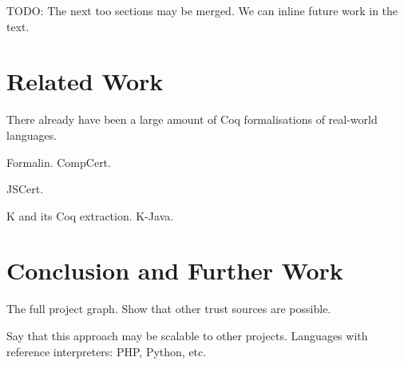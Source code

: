 \documentclass[9pt, sigplan, natbib=false, screen=true]{acmart}
\newcommand\Coq{Coq}
\begin{document}
TODO: The next too sections may be merged. We can inline future work in the text.
\section{Related Work}
\label{sec:related:work}

There already have been a large amount of \Coq{} formalisations
of real-world languages.

Formalin.
CompCert.

JSCert.

K and its \Coq{} extraction.
K-Java.


\section{Conclusion and Further Work}
\label{sec:conclusion}

The full project graph.
Show that other trust sources are possible.

Say that this approach may be scalable to other projects.
Languages with reference interpreters:
PHP, Python, etc.


\printbibliography
\end{document}

